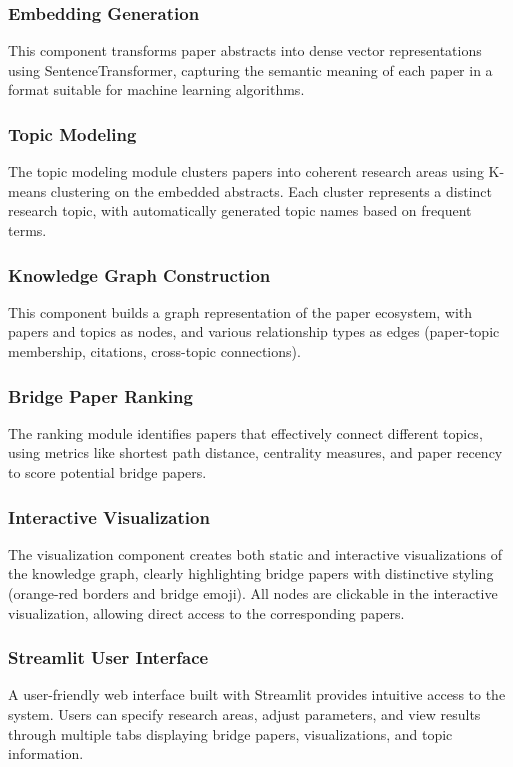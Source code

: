 \documentclass[11pt,a4paper]{article}
\begin{document}
\subsubsection{Embedding Generation}
This component transforms paper abstracts into dense vector representations using SentenceTransformer, capturing the semantic meaning of each paper in a format suitable for machine learning algorithms.

\subsubsection{Topic Modeling}
The topic modeling module clusters papers into coherent research areas using K-means clustering on the embedded abstracts. Each cluster represents a distinct research topic, with automatically generated topic names based on frequent terms.

\subsubsection{Knowledge Graph Construction}
This component builds a graph representation of the paper ecosystem, with papers and topics as nodes, and various relationship types as edges (paper-topic membership, citations, cross-topic connections).

\subsubsection{Bridge Paper Ranking}
The ranking module identifies papers that effectively connect different topics, using metrics like shortest path distance, centrality measures, and paper recency to score potential bridge papers.

\subsubsection{Interactive Visualization}
The visualization component creates both static and interactive visualizations of the knowledge graph, clearly highlighting bridge papers with distinctive styling (orange-red borders and bridge emoji). All nodes are clickable in the interactive visualization, allowing direct access to the corresponding papers.

\subsubsection{Streamlit User Interface}
A user-friendly web interface built with Streamlit provides intuitive access to the system. Users can specify research areas, adjust parameters, and view results through multiple tabs displaying bridge papers, visualizations, and topic information.
\end{document}
